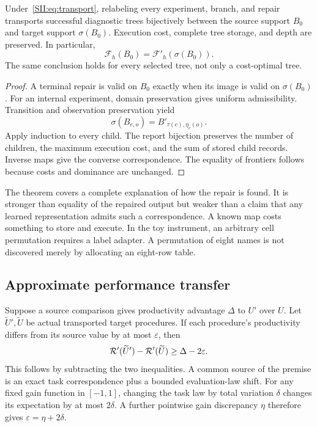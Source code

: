 \begin{SIItheorem}\label{SII:thm:transport}
Under~\eqref{SII:eq:transport}, relabeling every experiment, branch, and repair transports successful diagnostic trees bijectively between the source support $B_0$ and target support $\sigma(B_0)$. Execution cost, complete tree storage, and depth are preserved. In particular,
\[
\mathcal F_h(B_0)=\mathcal F'_h(\sigma(B_0)).
\]
The same conclusion holds for every selected tree, not only a cost-optimal tree.
\end{SIItheorem}
\begin{proof}
A terminal repair is valid on $B_0$ exactly when its image is valid on $\sigma(B_0)$. For an internal experiment, domain preservation gives uniform admissibility. Transition and observation preservation yield
\[
\sigma(B_{e,o})=B'_{\tau(e),\eta_e(o)}.
\]
Apply induction to every child. The report bijection preserves the number of children, the maximum execution cost, and the sum of stored child records. Inverse maps give the converse correspondence. The equality of frontiers follows because costs and dominance are unchanged.
\end{proof}

The theorem covers a complete explanation of how the repair is found. It is stronger than equality of the repaired output but weaker than a claim that any learned representation admits such a correspondence. A known map costs something to store and execute. In the toy instrument, an arbitrary cell permutation requires a label adapter. A permutation of eight names is not discovered merely by allocating an eight-row table.

\subsection{Approximate performance transfer}
Suppose a source comparison gives productivity advantage $\Delta$ to $U'$ over $U$. Let $\widetilde U',\widetilde U$ be actual transported target procedures. If each procedure's productivity differs from its source value by at most $\varepsilon$, then
\begin{equation}\label{SII:eq:gaintransport}
\mathcal R'(\widetilde U')-\mathcal R'(\widetilde U)
\geq\Delta-2\varepsilon.
\end{equation}
This follows by subtracting the two inequalities. A common source of the premise is an exact task correspondence plus a bounded evaluation-law shift. For any fixed gain function in $[-1,1]$, changing the task law by total variation $\delta$ changes its expectation by at most $2\delta$. A further pointwise gain discrepancy $\eta$ therefore gives $\varepsilon=\eta+2\delta$.

